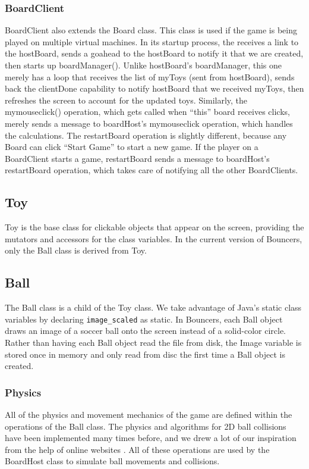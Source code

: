 \documentclass[11pt]{article}
\begin{document}
\subsubsection{BoardClient}
BoardClient also extends the Board class.  This class is used if the game is 
being played on multiple virtual machines.  In its startup process, the 
receives a link to the hostBoard, sends a goahead to the hostBoard to notify 
it that we are created, then starts up boardManager().  Unlike hostBoard’s 
boardManager, this one merely has a loop that receives the list of myToys 
(sent from hostBoard), sends back the clientDone capability to notify 
hostBoard that we received myToys, then refreshes the screen to account for 
the updated toys.  Similarly, the mymouseclick() operation, which gets called 
when “this” board receives clicks, merely sends a message to boardHost’s 
mymouseclick operation, which handles the calculations.  The restartBoard 
operation is slightly different, because any Board can click “Start Game” to 
start a new game.  If the player on a BoardClient starts a game, restartBoard 
sends a message to boardHost’s  restartBoard operation, which takes care of 
notifying all the other BoardClients.  
\subsection{Toy}
Toy is the base class for clickable objects that appear on the screen, 
providing the mutators and accessors for the class variables. In the
current version of Bouncers, only the Ball class is derived from Toy.

\subsection{Ball}
The Ball class is a child of the Toy class.  We take advantage of Java's 
static class variables by declaring \texttt{image\_scaled} as static.  In 
Bouncers, each Ball object draws an image of a soccer ball onto the screen 
instead of a solid-color circle.  Rather than having each Ball object read the
file from disk, the Image variable is stored once in memory and only read from
disc the first time a Ball object is created.

\subsubsection{Physics}
All of the physics and movement mechanics of the game are defined within the 
operations of the Ball class.  The physics and algorithms for 2D ball 
collisions have been implemented many times before, and we drew a lot of our
inspiration from the help of online websites
\cite{ballcollisionsA}\cite{Chuan}.  All of these operations are used by the
BoardHost class to simulate ball movements and collisions.
\end{document}

